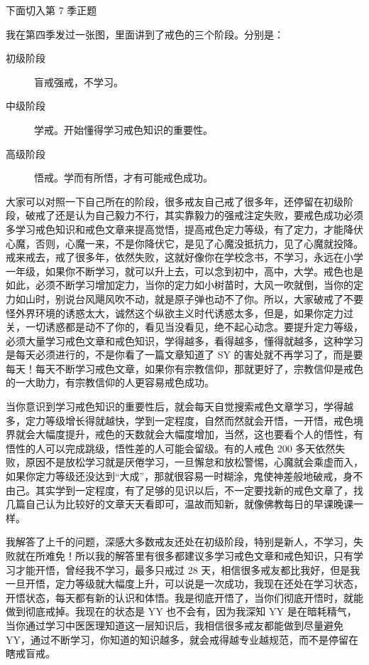 \documentclass{ctexart}
\begin{document}
下面切入第 7 季正题

我在第四季发过一张图，里面讲到了戒色的三个阶段。分别是：

\begin{description}
    \item[初级阶段] 盲戒强戒，不学习。
    \item[中级阶段] 学戒。开始懂得学习戒色知识的重要性。
    \item[高级阶段] 悟戒。学而有所悟，才有可能戒色成功。
\end{description}

大家可以对照一下自己所在的阶段，很多戒友自己戒了很多年，还停留在初级阶段，破戒了还是认为自己毅力不行，其实靠毅力的强戒注定失败，要戒色成功必须多学习戒色知识和戒色文章来提高觉悟，提高戒色定力等级，有了定力，才能降伏心魔，否则，心魔一来，不是你降伏它，是见了心魔没抵抗力，见了心魔就投降。戒来戒去，戒了很多年，依然失败，这就好像你在学校念书，不学习，永远在小学一年级，如果你不断学习，就可以升上去，可以念到初中，高中，大学。戒色也是如此，必须不断学习增加定力，当你的定力如小树苗时，大风一吹就倒，当你的定力如山时，别说台风飓风吹不动，就是原子弹也动不了你。所以，大家破戒了不要怪外界环境的诱惑太大，诚然这个纵欲主义时代诱惑太多，但是，如果你定力过关，一切诱惑都是动不了你的，看见当没看见，绝不起心动念。要提升定力等级，必须大量学习戒色文章和戒色知识，学得越多，看得越多，懂得就越多，这种学习是每天必须进行的，不是你看了一篇文章知道了 SY 的害处就不再学习了，而是要每天！每天不断学习戒色文章，如果你有宗教信仰，那就更好了，宗教信仰是戒色的一大助力，有宗教信仰的人更容易戒色成功。

当你意识到学习戒色知识的重要性后，就会每天自觉搜索戒色文章学习，学得越多，定力等级增长得就越快，学到一定程度，自然而然就会开悟，一开悟，戒色境界就会大幅度提升，戒色的天数就会大幅度增加，当然，这也要看个人的悟性，有悟性的人可以完成跳级，悟性差的人可能会留级。有的人戒色 200 多天依然失败，原因不是放松学习就是厌倦学习，一旦懈怠和放松警惕，心魔就会乘虚而入，如果你定力等级还没达到“大成”，那就很容易一时糊涂，鬼使神差般地破戒，身不由己。其实学到一定程度，有了足够的见识以后，不一定要找新的戒色文章了，找几篇自己认为比较好的文章天天看即可，温故而知新，就像佛教每日的早课晚课一样。

我解答了上千的问题，深感大多数戒友还处在初级阶段，特别是新人，不学习，失败就在所难免！所以我的解答里有很多都建议多学习戒色文章和戒色知识，只有学习才能开悟，曾经我不学习，最多只戒过 28 天，相信很多戒友都比我好，但是我一旦开悟，定力等级就大幅度上升，可以说是一次成功，我现在还处在学习状态，开悟状态，每天都有新的认识和体悟。我是彻底开悟了，当你们彻底开悟时，就能做到彻底戒掉。我现在的状态是 YY 也不会有，因为我深知 YY 是在暗耗精气，当你通过学习中医医理知道这一层知识后，我相信很多戒友都能做到尽量避免 YY，通过不断学习，你知道的知识越多，就会戒得越专业越规范，而不是停留在瞎戒盲戒。
\end{document}

